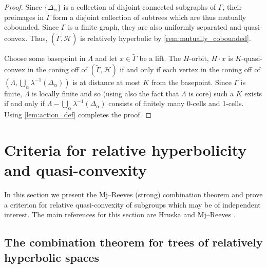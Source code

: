 \documentclass[11pt, a4paper]{amsart}
\theoremstyle{definition}
\newcommand{\wt}[1]{\widetilde{ #1 }}
\begin{document}
\begin{proof}
Since $\{\Delta_{\alpha}\}$ is a collection of disjoint connected subgraphs of $\Gamma$, their preimages in $\wt{\Gamma}$ form a disjoint collection of subtrees which are thus mutually cobounded. Since $\Gamma$ is a finite graph, they are also uniformly separated and quasi-convex. Thus, $(\widetilde{\Gamma}, \mathcal{H})$ is relatively hyperbolic by \cref{rem:mutually_cobounded}.

Choose some basepoint in $\Lambda$ and let $x\in \widetilde{\Gamma}$ be a lift. The $H$-orbit, $H\cdot x$ is $K$-quasi-convex in the coning off of $(\widetilde{\Gamma}, \mathcal{H})$ if and only if each vertex in the coning off of $(\Lambda, \bigcup_{\alpha}\lambda^{-1}(\Delta_{\alpha}))$ is at distance at most $K$ from the basepoint. Since $\Gamma$ is finite, $\Lambda$ is locally finite and so (using also the fact that $\Lambda$ is core) such a $K$ exists if and only if $\Lambda - \bigcup_{\alpha}\lambda^{-1}(\Delta_{\alpha})$ consists of finitely many 0-cells and 1-cells. Using \cref{lem:action_def} completes the proof.
\end{proof}


\section{Criteria for relative hyperbolicity and quasi-convexity}
\label{sec:criteria}

In this section we present the Mj--Reeves (strong) combination theorem \cite{MR08} and prove a criterion for relative quasi-convexity of subgroups which may be of independent interest. The main references for this section are Hruska \cite{Hr10} and Mj--Reeves \cite{MR08}.




\subsection{The combination theorem for trees of relatively hyperbolic spaces}
\end{document}
